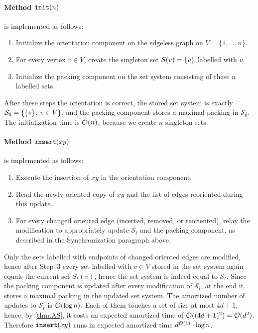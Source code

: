 \paragraph{Method $\mathtt{init}(n)$} is implemented as follows:
\begin{enumerate}
\item Initialize the orientation component on the edgeless graph on $V=\{1,\ldots,n\}$.
\item For every vertex $v\in V$, create the singleton set $S(v)=\{v\}$ labelled with $v$.
\item Initialize the packing component on the set system consisting of these $n$ labelled sets.
\end{enumerate}
After these steps the orientation is correct, the stored set system is exactly $\mathcal{S}_0=\{\{v\} \colon v\in V\}$, and the packing component stores a maximal packing in $\mathcal{S}_0$.
The initialization time is $\mathcal{O}(n)$, because we create $n$ singleton sets.

\paragraph{Method $\mathtt{insert}(xy)$} is implemented as follows:
\begin{enumerate}
\item Execute the insertion of $xy$ in the orientation component.
\item Read the newly oriented copy of $xy$ and the list of edges reoriented during this update.
\item For every changed oriented edge (inserted, removed, or reoriented), relay the modification to appropriately update $\mathcal{S}_t$ and the packing component, as described in the Synchronization paragraph above.
\end{enumerate}
Only the sets labelled with endpoints of changed oriented edges are modified, hence after Step~3 every set labelled with $v\in V$ stored in the set system again equals the current set $S_t(v)$, hence the set system is indeed equal to $\mathcal{S}_t$.
Since the packing component is updated after every modification of $\mathcal{S}_t$, at the end it stores a maximal packing in the updated set system.
The amortized number of updates to $\mathcal{S}_t$ is $\mathcal{O}(\log n)$.
Each of them touches a set of size at most $4d+1$, hence, by \cref{thm:AS}, it costs an expected amortized time of $\mathcal{O}((4d+1)^2)=\mathcal{O}(d^2)$.
Therefore $\mathtt{insert}(xy)$ runs in expected amortized time $d^{\mathcal{O}(1)}\cdot \log n$.

